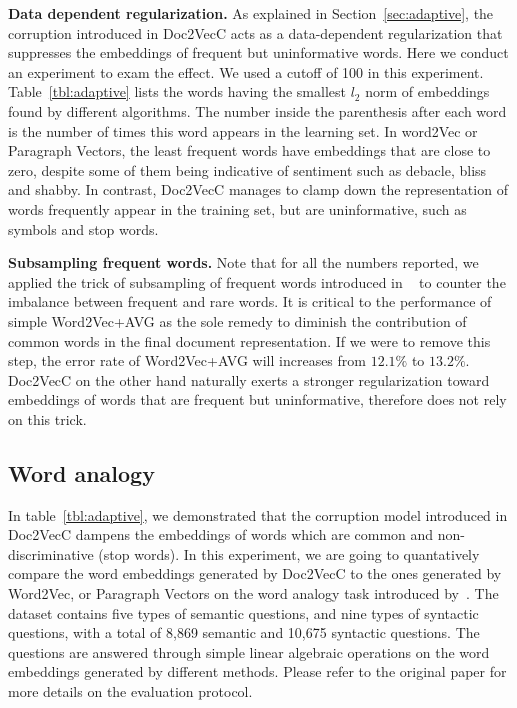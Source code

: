 \documentclass{article} \usepackage{iclr2017_conference,times}
\newcommand{\name}{Doc2VecC}
\begin{document}
\textbf{Data dependent regularization.} As explained in Section~\ref{sec:adaptive}, the corruption introduced in \name{} acts as a data-dependent regularization that suppresses the embeddings of frequent but uninformative words. Here we conduct an experiment to exam the effect. We used a cutoff  of 100 in this experiment. Table~\ref{tbl:adaptive} lists the words having the smallest $l_2$ norm of embeddings found by different algorithms. The number inside the parenthesis after each word is the number of times this word appears in the learning set. In word2Vec or Paragraph Vectors, the least frequent words have embeddings that are close to zero, despite some of them being indicative of sentiment such as debacle, bliss and shabby. In contrast, \name{} manages to clamp down the representation of words frequently appear in the training set, but are uninformative, such as symbols and stop words. 


\textbf{Subsampling frequent words.} Note that for all the numbers reported, we applied the trick of subsampling of frequent words introduced in ~\citep{mikolov2013distributed} to counter the imbalance between frequent and rare words. It is critical to the performance of simple Word2Vec+AVG as the sole remedy to diminish the contribution of common words in the final document representation. If we were to remove this step, the error rate of Word2Vec+AVG will increases from  $12.1\%$ to $13.2\%$. \name{} on the other hand naturally exerts a stronger regularization toward embeddings of words that are frequent but uninformative, therefore does not rely on this trick. 


\subsection{Word analogy}
In table~\ref{tbl:adaptive}, we demonstrated that the corruption model introduced in \name{}  dampens the embeddings of words which are common and non-discriminative (stop words). In this experiment, we are going to quantatively compare the word embeddings generated by \name{} to the ones generated by Word2Vec, or  Paragraph Vectors on the word analogy task introduced by~\cite{mikolov2013efficient}.  The dataset contains five types of semantic questions, and nine types of syntactic questions, with a total of 8,869 semantic and 10,675 syntactic questions. The questions are answered through simple linear algebraic operations on the word embeddings generated by different methods. Please refer to the original paper for more details on the evaluation protocol. 
\end{document}
